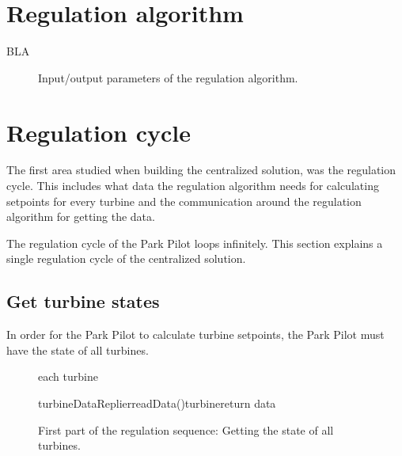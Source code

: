 


\section{Regulation algorithm}\label{sec:regAlgorithm}

BLA

\begin{figure}
	\centering
	

	\caption[Regulation algorithm input/output parameters]{
		\label{fig:ioRegAlg} 
		\footnotesize{%
			Input/output parameters of the regulation algorithm.
		}
	}
\end{figure}

\section{Regulation cycle}\label{sec:currentSystemCen} 

The first area studied when building the centralized solution, was the regulation cycle. This includes what data the regulation algorithm needs for calculating setpoints for every turbine and the communication around the regulation algorithm for getting the data.

The regulation cycle of the Park Pilot loops infinitely. This section explains a single regulation cycle of the centralized solution.

\subsection{Get turbine states}\label{sec:getTurbineStates}

In order for the Park Pilot to calculate turbine setpoints, the Park Pilot must have the state of all turbines.

\begin{figure}
	\centering
	\begin{sequencediagram} %
	
		\begin{sdblock}{each turbine}{}
			\begin {call}{turbineDataReplier}{readData()}{turbine}{return data}
			\end {call}
		\end{sdblock}				
	\end{sequencediagram}

	\caption[First part of the regulation cycle]{
		\label{fig:getStatesOfTurbines} 
		\footnotesize{%
			First part of the regulation sequence: Getting the state of all turbines.
		}
	}
\end{figure}

